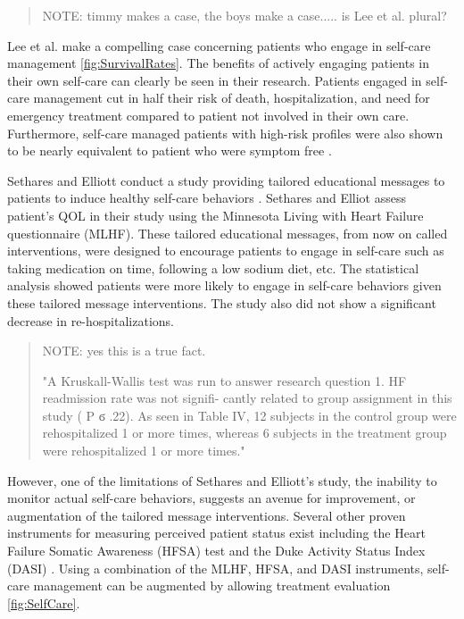\begin{verse}
NOTE: timmy makes a case, the boys make a case..... is Lee et al. plural?
\end{verse}

Lee et al. make a compelling case concerning patients who engage in self-care management \cref{fig:SurvivalRates}. \cite{Lee2011} The benefits of actively engaging patients in their own self-care can clearly be seen in their research.   Patients engaged in self-care management cut in half their risk of death, hospitalization, and need for emergency treatment compared to patient not involved in their own care. Furthermore, self-care managed patients with high-risk profiles were also shown to be nearly equivalent to patient who were symptom free \cite{Lee2011}.

Sethares and Elliott conduct a study providing tailored educational messages to patients to induce healthy self-care behaviors \cite{Sethares2004249}. Sethares and Elliot assess patient's QOL in their study using the Minnesota Living with Heart Failure questionnaire (MLHF). These tailored educational messages, from now on called interventions, were designed to encourage patients to engage in self-care such as taking medication on time, following a low sodium diet, etc. The statistical analysis showed patients were more likely to engage in self-care behaviors given these tailored message interventions. The study also did not show a significant decrease in re-hospitalizations. 
\begin{quote}
NOTE: yes this is a true fact.


"A Kruskall-Wallis test was run to answer research
question 1. HF readmission rate was not signifi-
cantly related to group assignment in this study ( P
ϭ .22). As seen in Table IV, 12 subjects in the
control group were rehospitalized 1 or more times,
whereas 6 subjects in the treatment group were
rehospitalized 1 or more times."
\end{quote}

However, one of the limitations of Sethares and Elliott's study, the inability to monitor actual self-care behaviors, suggests an avenue for improvement, or augmentation of the tailored message interventions. Several other proven instruments for measuring perceived patient status exist including the Heart Failure Somatic Awareness (HFSA) \cite{Jurgens2006} test and the Duke Activity Status Index (DASI) \cite{Hlatky1989}. Using a combination of the MLHF, HFSA, and DASI instruments, self-care management can be augmented by allowing treatment evaluation \cref{fig:SelfCare}.   

